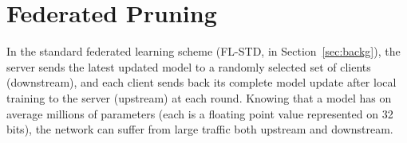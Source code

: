 \documentclass[accepted]{uai2021} %
\begin{document}










\section{Federated Pruning}

\label{sec:fl_top_k}

In the standard federated learning scheme (FL-STD, in Section~\ref{sec:backg}), the server sends the latest updated model to a randomly selected set of clients (downstream), and each client sends back its complete model update after local training to the server (upstream) at each round. Knowing that a model has on average millions of parameters (each is a floating point value represented on 32 bits), the network can suffer from large traffic both upstream and downstream. 
\end{document}
